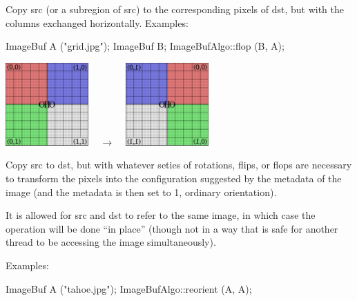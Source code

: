  
Copy {\cf src} (or a subregion of {\cf src}) to the corresponding pixels
of {\cf dst}, but with the columns exchanged horizontally.
\smallskip
\noindent Examples:
\begin{code}
    ImageBuf A ("grid.jpg");
    ImageBuf B;
    ImageBufAlgo::flop (B, A);
\end{code}
\spc \includegraphics[width=1.25in]{figures/grid-small.jpg}
~ {\Huge $\rightarrow$} ~
\includegraphics[width=1.25in]{figures/flop.jpg} \\
\apiend


 
Copy {\cf src} to {\cf dst}, but with whatever seties of rotations, flips,
or flops are necessary to transform the pixels into the configuration
suggested by the  metadata of the image (and the
 metadata is then set to 1, ordinary orientation).

It is allowed for {\cf src} and {\cf dst} to refer to the same image, in
which case the operation will be done ``in place'' (though not in a way
that is safe for another thread to be accessing the image simultaneously).

\smallskip
\noindent Examples:
\begin{code}
    ImageBuf A ("tahoe.jpg");
    ImageBufAlgo::reorient (A, A);
\end{code}
\apiend


